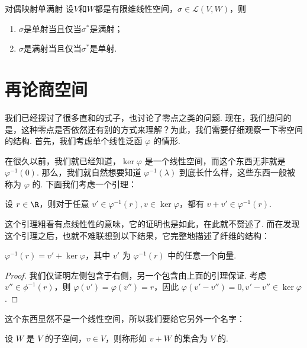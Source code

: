 \begin{corollary}{}{对偶映射单满射}
    设$V$和$W$都是有限维线性空间，$\sigma\in\mathcal{L}(V,W)$，则
    \begin{enumerate}
        \item $\sigma$是单射当且仅当$\sigma^*$是满射；

        \item $\sigma$是满射当且仅当$\sigma^*$是单射.
    \end{enumerate}
\end{corollary}

\section{再论商空间}

我们已经探讨了很多直和的式子，也讨论了零点之类的问题. 现在，我们想问的是，这种零点是否依然还有别的方式来理解？为此，我们需要仔细观察一下零空间的结构. 首先，我们考虑单个线性泛函 $\varphi$ 的情形.

在很久以前，我们就已经知道，$\ker \varphi$ 是一个线性空间，而这个东西无非就是 $\varphi^{-1} (0)$. 那么，我们就自然想要知道 $\varphi^{-1} (\lambda)$ 到底长什么样，这些东西一般被称为 $\varphi$ 的. 下面我们考虑一个引理：

\begin{lemma}{}{}
    设 $r \in \R$，则对于任意 $v' \in \varphi^{-1}(r), v \in \ker \varphi$，都有 $v + v' \in \varphi^{-1} (r)$.
\end{lemma}

这个引理粗看有点线性性的意味，它的证明也是如此，在此就不赘述了. 而在发现这个引理之后，也就不难联想到以下结果，它完整地描述了纤维的结构：

\begin{theorem}{}{}
    $\varphi^{-1} (r) = v' + \ker \varphi$，其中 $v'$ 为 $\varphi^{-1} (r)$ 中的任意一个向量.
\end{theorem}

\begin{proof}
    我们仅证明左侧包含于右侧，另一个包含由上面的引理保证. 考虑 $v'' \in \phi^{-1} (r)$，则 $\varphi (v') = \varphi (v'') = r$，因此 $\varphi(v' - v'') = 0, v' - v'' \in \ker \varphi$.
\end{proof}

这个东西显然不是一个线性空间，所以我们要给它另外一个名字：

\begin{definition}{}{}
    设 $W$ 是 $V$ 的子空间，$v \in V$，则称形如 $v + W$ 的集合为 $V$ 的.
\end{definition}

